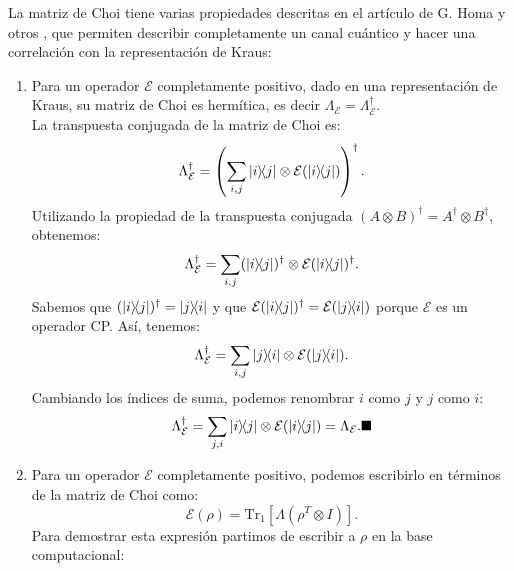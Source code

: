 \documentclass[letterpaper,12pt]{thesisECFM}
\theoremstyle{plain}
\theoremstyle{definition}
\theoremstyle{definition}
\theoremstyle{remark}
\newcommand{\1}{\mathbb{1}}
\begin{document}
La matriz de Choi tiene  varias propiedades descritas en el artículo de  G. Homa  y otros \cite{Choi2024},  que permiten describir completamente un canal cuántico y hacer una correlación con la representación de Kraus:
\begin{enumerate}
     \item Para un operador $\mathcal{E}$ completamente positivo, dado en una representación de Kraus, su matriz de Choi es hermítica, es decir $\Lambda_{\mathcal{E}} = \Lambda_{\mathcal{E}}^{\dagger}$.\\ 
        La transpuesta conjugada de la matriz de Choi es: 
        \begin{equation*}
            \Lambda_{\mathcal{E}}^\dagger = \left(\sum_{i, j} \ketbra{i}{j} \otimes \mathcal{E}(\ketbra{i}{j}) \right)^\dagger.
        \end{equation*}
        Utilizando la propiedad de la transpuesta conjugada $(A \otimes B)^\dagger = A^\dagger \otimes B^\dagger$, obtenemos:
        \begin{equation}
          \Lambda_{\mathcal{E}}^\dagger = \sum_{i, j} (\ketbra{i}{j})^\dagger \otimes \mathcal{E}(\ketbra{i}{j})^\dagger.  
        \end{equation}
        Sabemos que $(\ketbra{i}{j})^\dagger = \ketbra{j}{i}$ y que $\mathcal{E}(\ketbra{i}{j})^\dagger = \mathcal{E}(\ketbra{j}{i})$ porque $\mathcal{E}$ es un operador CP. Así, tenemos:
        \begin{equation}
         \Lambda_{\mathcal{E}}^\dagger = \sum_{i, j} \ketbra{j}{i} \otimes \mathcal{E}(\ketbra{j}{i}).   
        \end{equation}
        Cambiando los índices de suma, podemos renombrar $i$ como $j$ y $j$ como $i$:
        \begin{equation}
           \Lambda_{\mathcal{E}}^\dagger = \sum_{j, i} \ketbra{i}{j} \otimes \mathcal{E}(\ketbra{i}{j}) = \Lambda_{\mathcal{E}}. \blacksquare
        \end{equation}
    \item Para un operador $\mathcal{E}$ completamente positivo, podemos escribirlo en términos de la matriz de Choi como:
            \begin{equation}\label{ec:canal_choi_form}
            \mathcal{E} (\rho) = \text{Tr}_1 [ \Lambda (\rho^{T} \otimes I)].
            \end{equation}
            Para demostrar esta expresión partimos de escribir a  $\rho$ en la base computacional:
        \begin{equation} \label{ec:densidad_computacional}

\end{equation}
\end{enumerate}
\end{document}
